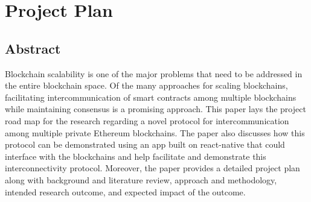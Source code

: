\documentclass[a4paper,twoside,phd]{BYUPhys}
\begin{document}

\appendix
\chapter{Project Plan}
\section{Abstract}
Blockchain scalability is one of the major problems that need to be addressed in the entire blockchain space. Of the many approaches for scaling blockchains, facilitating intercommunication of smart contracts among multiple blockchains while maintaining consensus is a promising approach. This paper lays the project road map for the research regarding a novel protocol for intercommunication among multiple private Ethereum blockchains. The paper also discusses how this protocol can be demonstrated using an app built on react-native that could interface with the blockchains and help facilitate and demonstrate this interconnectivity protocol. Moreover, the paper provides a detailed project plan along with background and literature review, approach and methodology, intended research outcome, and expected impact of the outcome.
\end{document}
